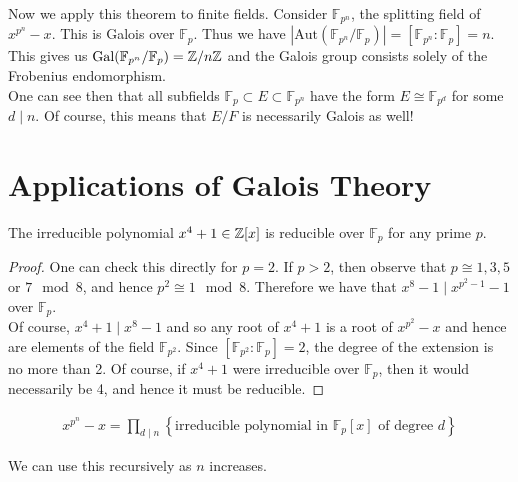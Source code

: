 \documentclass{memoir}
\begin{document}


Now we apply this theorem to finite fields. Consider \(\mathbb{F}_{p^{n}}\), the splitting field of \(x^{p^{n}}-x\). This is Galois over \(\mathbb{F}_p\). Thus we have \(\left| \textrm{Aut}(\mathbb{F}_{p^{n}} / \mathbb{F}_p )\right| = [ \mathbb{F}_{p^{n}}: \mathbb{F}_p ] = n \). This gives us \(\textrm{Gal}(\mathbb{F}_{p^{n}} / \mathbb{F}_p ) = \mathbb{Z} / n\mathbb{Z}\) and the Galois group consists solely of the Frobenius endomorphism.\\

One can see then that all subfields \(\mathbb{F}_p\subset E\subset \mathbb{F}_{p^{n}}\) have the form \(E \cong \mathbb{F}_{p^{d}}\) for some \(d\mid n\). Of course, this means that \(E / F\) is necessarily Galois as well!

\section{Applications of Galois Theory}
\label{sec:applications_of_galois_theory}

\begin{prop}
	The irreducible polynomial \(x^{4}+1 \in \mathbb{Z}[x]\) is reducible over \(\mathbb{F}_p\) for any prime \(p\).
\end{prop}
\begin{proof}
	One can check this directly for \(p=2\). If \(p>2\), then observe that \(p \cong 1,3,5\) or \(7 \mod 8\), and hence \(p^2 \cong 1 \mod 8\). Therefore we have that \(x^{8}-1 \mid x^{p^2-1}-1\) over \(\mathbb{F}_p\).\\

	Of course, \(x^{4}+1 \mid x^{8}-1\) and so any root of \(x^{4}+1\) is a root of \(x^{p^2}-x\) and hence are elements of the field \(\mathbb{F}_{p^2}\). Since \([\mathbb{F}_{p^2}:\mathbb{F}_p] = 2\), the degree of the extension is no more than 2. Of course, if \(x^{4}+1\) were irreducible over \(\mathbb{F}_p\), then it would necessarily be 4, and hence it must be reducible.
\end{proof}

\begin{prop}
	\begin{align*}
		x^{p^{n}}-x = \prod_{d\mid n} \left\{ \text{irreducible polynomial in \(\mathbb{F}_p[x]\) of degree \(d\)} \right\}  
	\end{align*}
\end{prop}
We can use this recursively as \(n\) increases.
\end{document}
